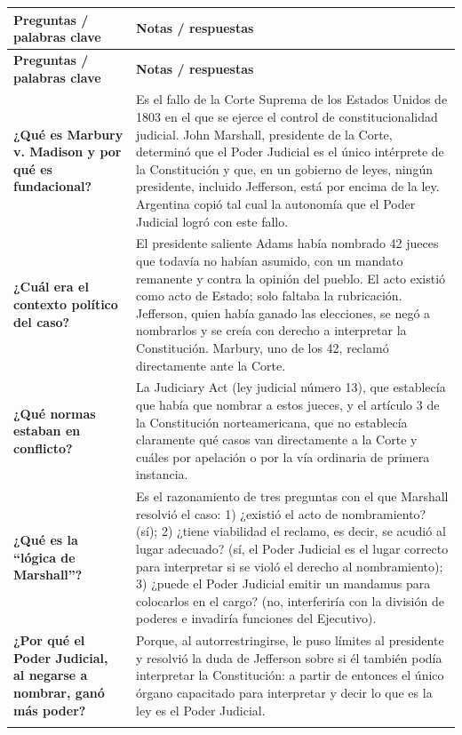 \documentclass[12pt,oneside,a4paper]{book}
\newcommand{\cornellsep}{\\ \addlinespace \cmidrule{1-2} \addlinespace}
\begin{document}
\begin{longtable}{@{}>{\RaggedRight\arraybackslash}p{}>{\RaggedRight\arraybackslash}p{}@{}}
\toprule
\textbf{Preguntas / palabras clave} & \textbf{Notas / respuestas} \\
\midrule
\endfirsthead
\toprule
\textbf{Preguntas / palabras clave} & \textbf{Notas / respuestas} \\
\midrule
\endhead
\bottomrule
\endfoot
\bottomrule
\endlastfoot

\textbf{¿Qué es Marbury v. Madison y por qué es fundacional?} &
Es el fallo de la Corte Suprema de los Estados Unidos de 1803 en el que se ejerce el control de constitucionalidad judicial. John Marshall, presidente de la Corte, determinó que el Poder Judicial es el único intérprete de la Constitución y que, en un gobierno de leyes, ningún presidente, incluido Jefferson, está por encima de la ley. Argentina copió tal cual la autonomía que el Poder Judicial logró con este fallo.
\cornellsep

\textbf{¿Cuál era el contexto político del caso?} &
El presidente saliente Adams había nombrado 42 jueces que todavía no habían asumido, con un mandato remanente y contra la opinión del pueblo. El acto existió como acto de Estado; solo faltaba la rubricación. Jefferson, quien había ganado las elecciones, se negó a nombrarlos y se creía con derecho a interpretar la Constitución. Marbury, uno de los 42, reclamó directamente ante la Corte.
\cornellsep

\textbf{¿Qué normas estaban en conflicto?} &
La Judiciary Act (ley judicial número 13), que establecía que había que nombrar a estos jueces, y el artículo 3 de la Constitución norteamericana, que no establecía claramente qué casos van directamente a la Corte y cuáles por apelación o por la vía ordinaria de primera instancia.
\cornellsep

\textbf{¿Qué es la ``lógica de Marshall''?} &
Es el razonamiento de tres preguntas con el que Marshall resolvió el caso: 1) ¿existió el acto de nombramiento? (sí); 2) ¿tiene viabilidad el reclamo, es decir, se acudió al lugar adecuado? (sí, el Poder Judicial es el lugar correcto para interpretar si se violó el derecho al nombramiento); 3) ¿puede el Poder Judicial emitir un mandamus para colocarlos en el cargo? (no, interferiría con la división de poderes e invadiría funciones del Ejecutivo).
\cornellsep

\textbf{¿Por qué el Poder Judicial, al negarse a nombrar, ganó más poder?} &
Porque, al autorrestringirse, le puso límites al presidente y resolvió la duda de Jefferson sobre si él también podía interpretar la Constitución: a partir de entonces el único órgano capacitado para interpretar y decir lo que es la ley es el Poder Judicial.
\cornellsep


\end{longtable}
\end{document}
